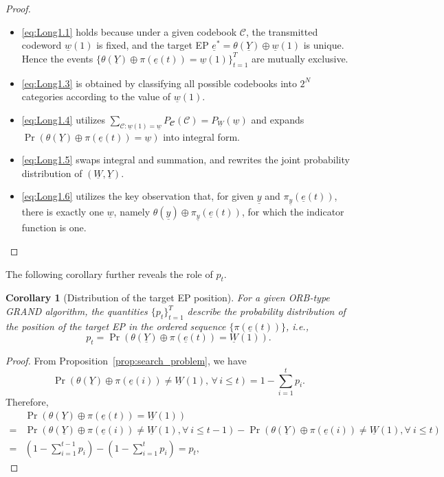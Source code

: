 \documentclass[letterpaper,draftclsnofoot,onecolumn]{IEEEtran}
\newtheorem{corollary}{Corollary}
\begin{document}
\begin{proof}
\begin{itemize}
        \item \eqref{eq:Long1.1} holds because under a given codebook $\mathcal{C}$, the transmitted codeword $\underline{w}(1)$ is fixed, and the target EP $\underline{e}^*=\theta(\underline{Y})\oplus\underline{w}(1)$ is unique. Hence the events $\{\theta(\underline{Y})\oplus\pi(\underline{e}(t))=\underline{w}(1)\}_{t=1}^{T}$ are mutually exclusive.
        \item \eqref{eq:Long1.3} is obtained by classifying all possible codebooks into $2^N$ categories according to the value of $\underline{w}(1)$.
        \item \eqref{eq:Long1.4} utilizes $\sum_{\mathcal{C}:\underline{w}(1)=\underline{w}} P_{\mathbfcal{C}}(\mathcal{C}) = P_{\underline{W}}(\underline{w})$ and expands $\Pr(\theta(\underline{Y})\oplus \pi(\underline{e}(t))= \underline{w})$ into integral form.
        \item \eqref{eq:Long1.5} swaps integral and summation, and rewrites the joint probability distribution of $(\underline{W}, \underline{Y})$.
        \item \eqref{eq:Long1.6} utilizes the key observation that, for given $\underline{y}$ and $\pi_{\underline{y}}(\underline{e}(t))$, there is exactly one $\underline{w}$, namely $\theta(\underline{y})\oplus \pi_{\underline{y}}(\underline{e}(t))$, for which the indicator function is one.
    \end{itemize}
\end{proof}

The following corollary further reveals the role of $p_t$.

\begin{corollary}[Distribution of the target EP position]
\label{coro:distribution_pt}
For a given ORB-type GRAND algorithm, the quantities $\{p_t\}_{t=1}^T$ describe the probability distribution of the position of the target EP in the ordered sequence $\{\pi(\underline{e}(t))\}$, i.e.,
\begin{equation}
p_t
=
\Pr(\theta(\underline{Y})\oplus\pi(\underline{e}(t))=\underline{W}(1)).
\end{equation}
\end{corollary}
\begin{proof}
From Proposition~\ref{prop:search_problem}, we have
\begin{equation}
    \Pr(\theta(\underline{Y})\oplus\pi(\underline{e}(i))\neq
    \underline{W}(1),\,\forall\, i \le t) = 1-\sum_{i=1}^{t}p_i .
\end{equation}
Therefore,
\begin{align}
    & \Pr(\theta(\underline{Y})\oplus \pi(\underline{e}(t)) = \underline{W}(1)) \\
    = & \Pr(\theta(\underline{Y})\oplus \pi(\underline{e}(i))\neq \underline{W}(1),\forall\ i \leq t-1) - \Pr(\theta(\underline{Y})\oplus \pi(\underline{e}(i))\neq \underline{W}(1),\forall\ i \leq t)\\
    = & \left(1 - \sum_{i=1}^{t-1}p_i\right) - \left(1 - \sum_{i=1}^{t}p_i\right) = p_t,
\end{align}
\end{proof}
\end{document}
